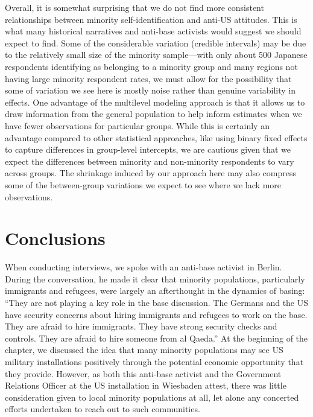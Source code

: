Overall, it is somewhat surprising that we do not find more consistent relationships between minority self-identification and anti-US attitudes. This is what many historical narratives and anti-base activists would suggest we should expect to find. Some of the considerable variation (credible intervals) may be due to the relatively small size of the minority sample---with only about 500 Japanese respondents identifying as belonging to a minority group and many regions not having large minority respondent rates, we must allow for the possibility that some of variation we see here is mostly noise rather than genuine variability in effects. One advantage of the multilevel modeling approach is that it allows us to draw information from the general population to help inform estimates when we have fewer observations for particular groups. While this is certainly an advantage compared to other statistical approaches, like using binary fixed effects to capture differences in group-level intercepts, we are cautious given that we expect the differences between minority and non-minority respondents to vary across groups. The shrinkage induced by our approach here may also compress some of the between-group variations we expect to see where we lack more observations.

\section*{Conclusions}

When conducting interviews, we spoke with an anti-base activist in Berlin. During the conversation, he made it clear that minority populations, particularly immigrants and refugees, were largely an afterthought in the dynamics of basing: ``They are not playing a key role in the base discussion. The Germans and the US have security concerns about hiring immigrants and refugees to work on the base. They are afraid to hire immigrants. They have strong security checks and controls. They are afraid to hire someone from al Qaeda.''\cite{berlinone20190723} At the beginning of the chapter, we discussed the idea that many minority populations may see US military installations positively through the potential economic opportunity that they provide. However, as both this anti-base activist and the Government Relations Officer at the US installation in Wiesbaden attest, there was little consideration given to local minority populations at all, let alone any concerted efforts undertaken to reach out to such communities. 


